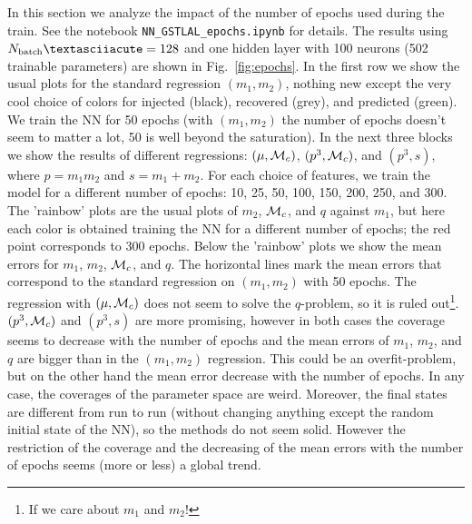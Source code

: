 \documentclass[prd,aps,twocolumn,a4paper,showkeys,nofootinbib]{revtex4-1}
\def\Mc{{\cal M}_c}
\begin{document}
%
In this section we analyze the impact of the number of epochs used during the train. See the notebook \texttt{NN{\_}GSTLAL{\_}epochs.ipynb} for details.
The results using $N_{\rm batch}´ = 128$ and one hidden
layer with 100 neurons (502 trainable parameters) are shown in Fig.~\ref{fig:epochs}.
In the first row we show the usual plots for the standard regression $(m_1, m_2)$, 
nothing new except the very cool choice of colors for injected (black), recovered (grey),
and predicted (green). We train the NN for 50 epochs (with $(m_1, m_2)$
the number of epochs doesn't seem to matter a lot, 50 is well beyond the saturation). 
In the next three blocks we show the results of different regressions:
$(\mu, \Mc)$, $(p^3, \Mc)$, and $(p^3, s)$, where $p=m_1 m_2$ and $s=m_1+m_2$.
For each choice of features, we train the model for a different
number of epochs: 10, 25, 50, 100, 150, 200, 250, and 300.
The 'rainbow' plots are the usual plots of $m_2$, $\Mc$, and $q$ against $m_1$, 
but here each color is obtained training the NN for a different number of epochs;
the red point corresponds to 300 epochs. Below the 'rainbow' plots we
show the mean errors for $m_1$, $m_2$, $\Mc$, and $q$. The horizontal lines
mark the mean errors that correspond to the standard regression
on $(m_1, m_2)$ with 50 epochs. The regression with 
$(\mu, \Mc)$ does not seem to solve the $q$-problem, so it is ruled out\footnote{If we
care about $m_1$ and $m_2$!}.
$(p^3, \Mc)$ and $(p^3, s)$ are more promising, however in both cases 
the coverage seems to decrease with the number of epochs and the 
mean errors of $m_1$, $m_2$, and $q$ are bigger than in the $(m_1, m_2)$ regression. 
This could be an overfit-problem,
but on the other hand the mean error decrease with the number of epochs. 
In any case, the coverages of the parameter space are weird. 
Moreover, the final states are different from run to run (without changing anything
except the random initial state of the NN), so the methods do
not seem solid. However the restriction of the coverage and the decreasing 
of the mean errors with the number of epochs seems (more or less) a global trend.  
\end{document}
